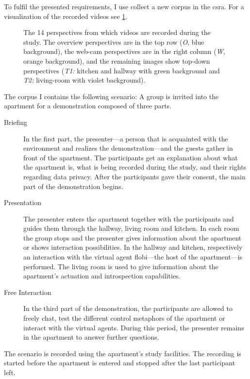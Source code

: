 To fulfil the presented requirements, I use collect a new corpus in the \gls{csra}.
For a visualization of the recorded videos see \cref{fig:group-perspectives}.
\begin{figure}[htb]
  \centering
    \def\svgwidth{\textwidth}
    
    \caption[Group detection study video perspectives.]{\label{fig:group-perspectives} The 14 perspectives from which videos are recorded during the study. 
    The overview perspectives are in the top row (\emph{O}, blue background), 
    the web-cam perspectives are in the right column (\emph{W}, orange background), and the remaining images show top-down perspectives (\emph{T1:} kitchen and hallway with green background and \emph{T2:} living-room with violet background).
    }
\end{figure}
The corpus I contains the following scenario:
A group is invited into the \gls{apartment} for a demonstration composed of three parts.
\begin{description}
    \item[Briefing] In the first part, the presenter---a person that is acquainted with the environment and realizes the demonstration---and the guests ga\-ther in front of the \gls{apartment}.
    The participants get an explanation about what the \gls{apartment} is, what is being recorded during the study, and their rights regarding data privacy.
    After the participants gave their consent, the main part of the demonstration begins.
    \item[Presentation] The presenter enters the \gls{apartment} together with the participants and guides them through the hallway, living room and kitchen.
    In each room the group stops and the presenter gives information about the \gls{apartment} or shows interaction possibilities.
    In the hallway and kitchen, respectively an interaction with the \gls{virtual agent} \gls{flobi}---the host of the \gls{apartment}---is performed.
    The living room is used to give information about the \gls{apartment}'s actuation and introspection capabilities.
    \item[Free Interaction] In the third part of the demonstration, the participants are allowed to freely chat, test the different control metaphors of the \gls{apartment} or interact with the \glspl{virtual agent}.
    During this period, the presenter remains in the \gls{apartment} to answer further questions.
\end{description}
The scenario is recorded using the \gls{apartment}'s study facilities.
The recording is started before the \gls{apartment} is entered and stopped after the last participant left.

